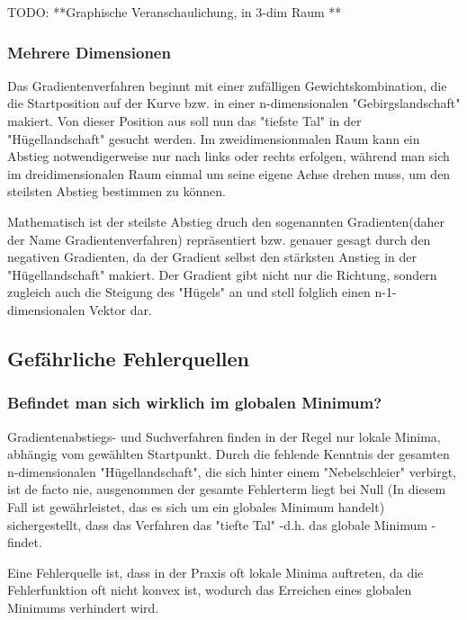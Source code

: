   TODO: **Graphische Veranschaulichung, in 3-dim Raum **
\subsubsection{Mehrere Dimensionen}\label{subsec:gradientenverfahren:mehrere_dimensionen}
  Das Gradientenverfahren beginnt mit einer zufälligen Gewichtskombination, die die Startposition auf der Kurve bzw. in einer n-dimensionalen "Gebirgslandschaft" makiert.
  Von dieser Position aus soll nun das "tiefste Tal" in der "Hügellandschaft" gesucht werden.
  Im zweidimensionmalen Raum kann ein Abstieg notwendigerweise nur nach links oder rechts erfolgen, während man sich im dreidimensionalen Raum einmal um seine eigene Achse drehen muss,
  um den steilsten Abstieg bestimmen zu können.

  Mathematisch ist der steilste Abstieg druch den sogenannten Gradienten(daher der Name Gradientenverfahren) repräsentiert bzw. genauer gesagt durch den negativen Gradienten, da der 
  Gradient selbst den stärksten Anstieg in der "Hügellandschaft" makiert. Der Gradient gibt nicht nur die Richtung, sondern zugleich auch die Steigung des "Hügels" an und stell folglich
  einen n-1-dimensionalen Vektor dar.\cite{GR10}



\subsection{Gefährliche Fehlerquellen}\label{subsec:gradientenverfahren:fehlerquellen}
\subsubsection{Befindet man sich wirklich im globalen Minimum?}\label{subsec:gradientenverfahren:fehlerquellen_globalen_minimum}
  Gradientenabstiegs- und Suchverfahren finden in der Regel nur lokale Minima, abhängig vom gewählten Startpunkt. Durch die fehlende Kenntnis der gesamten n-dimensionalen "Hügellandschaft", die sich hinter 
  einem "Nebelschleier" verbirgt, ist de facto nie, ausgenommen der gesamte Fehlerterm liegt bei Null (In diesem Fall ist gewährleistet, das es sich um ein globales Minimum handelt)
  sichergestellt, dass das Verfahren das "tiefte Tal" -d.h. das globale Minimum - findet.

  Eine Fehlerquelle ist, dass in der Praxis oft lokale Minima auftreten, da die Fehlerfunktion oft nicht konvex ist, wodurch das Erreichen eines globalen Minimums verhindert wird.




